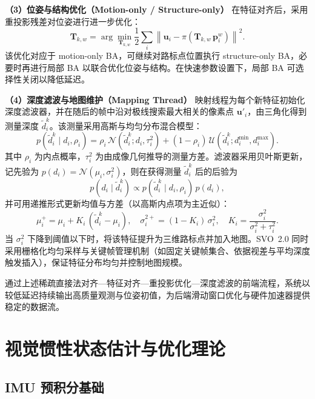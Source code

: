 \textbf{（3）位姿与结构优化（Motion-only / Structure-only）}
在特征对齐后，采用重投影残差对位姿进行进一步优化：
\begin{equation}
\mathbf{T}_{k,w} = \arg\min_{\mathbf{T}_{k,w}} \frac{1}{2} \sum_i \left\| \mathbf{u}_i - \pi\!\left( \mathbf{T}_{k,w} \, \mathbf{p}_i^w \right) \right\|^2.
\end{equation}
该优化对应于 motion-only BA，可继续对路标点位置执行 structure-only BA，必要时再进行局部 BA 以联合优化位姿与结构。在快速参数设置下，局部 BA 可选择性关闭以降低延迟。

\textbf{（4）深度滤波与地图维护（Mapping Thread）}
映射线程为每个新特征初始化深度滤波器，并在随后的帧中沿对极线搜索最大相关的像素点 $\mathbf{u}'_i$，由三角化得到测量深度 $\tilde d_i^k$。该测量采用高斯与均匀分布混合模型：
\begin{equation}
 p(\tilde d_i^k \mid d_i, \rho_i) = \rho_i \, \mathcal{N}(\tilde d_i^k; d_i, \tau_i^2) + (1-\rho_i) \, \mathcal{U}(\tilde d_i^k; d_i^{\min}, d_i^{\max}).
\end{equation}
其中 $\rho_i$ 为内点概率，$\tau_i^2$ 为由成像几何推导的测量方差。滤波器采用贝叶斯更新，记先验为 $p(d_i)=\mathcal{N}(\mu_i,\sigma_i^2)$，则在获得测量 $\tilde d_i^k$ 后的后验为
\begin{equation}
 p(d_i\mid \tilde d_i^k) \propto p(\tilde d_i^k\mid d_i,\rho_i)\, p(d_i),
\end{equation}
并可用递推形式更新均值与方差（以高斯内点项为主近似）：
\begin{equation}
\mu_i^{+} = \mu_i + K_i\,(\tilde d_i^k-\mu_i),\quad
\sigma_i^{2+} = (1-K_i)\,\sigma_i^2,\quad
K_i = \frac{\sigma_i^2}{\sigma_i^2+\tau_i^2}.
\end{equation}
当 $\sigma_i^2$ 下降到阈值以下时，将该特征提升为三维路标点并加入地图。SVO~2.0 同时采用栅格化均匀采样与关键帧管理机制（如固定关键帧集合、依据视差与平均深度触发插入），保证特征分布均匀并控制地图规模。

通过上述稀疏直接法对齐—特征对齐—重投影优化—深度滤波的前端流程，系统以较低延迟持续输出高质量观测与位姿初值，为后端滑动窗口优化与硬件加速器提供稳定的数据流。

\section{视觉惯性状态估计与优化理论}

\subsection{IMU 预积分基础}

